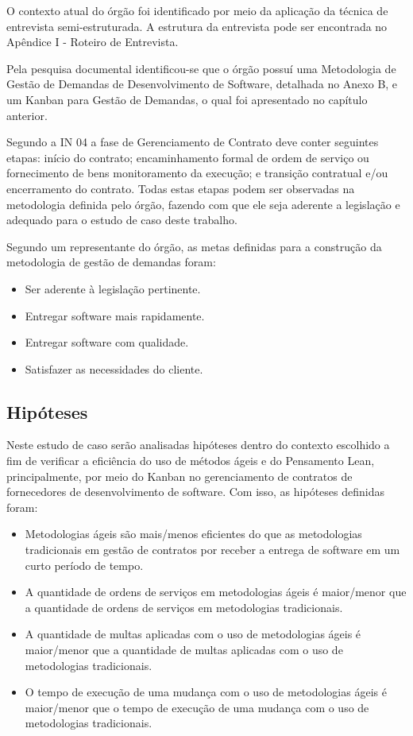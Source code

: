 O contexto atual do órgão foi identificado por meio da aplicação da técnica de entrevista semi-estruturada. A estrutura da entrevista pode ser encontrada no Apêndice I -  Roteiro de Entrevista. 

Pela pesquisa documental identificou-se que o órgão possuí uma Metodologia de Gestão de Demandas de Desenvolvimento de Software, detalhada no Anexo B, e um Kanban para Gestão de 
Demandas, o qual foi apresentado no capítulo anterior. 

Segundo a IN 04 a fase de Gerenciamento de Contrato deve conter seguintes etapas: início do contrato; encaminhamento formal de ordem de serviço ou fornecimento de bens  monitoramento da execução; e transição contratual e/ou encerramento do contrato. Todas estas etapas podem ser observadas na metodologia definida pelo órgão, fazendo com que ele seja aderente a legislação e adequado para o estudo de caso deste trabalho.

Segundo um representante do órgão, as metas definidas para a construção da metodologia de gestão de demandas foram:
\begin{itemize}
\item Ser aderente à legislação pertinente.
\item Entregar software mais rapidamente.
\item Entregar software com qualidade.
\item Satisfazer as necessidades do cliente.
\end{itemize}

\subsection[Hipóteses]{Hipóteses}

Neste estudo de caso serão analisadas hipóteses dentro do contexto escolhido a fim de verificar a eficiência do uso de métodos ágeis e do Pensamento Lean, principalmente, por meio do Kanban no gerenciamento de contratos de fornecedores de desenvolvimento de software. Com isso, as hipóteses definidas foram:
\begin{itemize}
\item  Metodologias ágeis são mais/menos eficientes do que as metodologias tradicionais em gestão de contratos por receber a entrega de software em um curto período de tempo.
\item	A quantidade de ordens de serviços em metodologias ágeis é maior/menor que a quantidade de ordens de serviços em metodologias tradicionais.
\item	A quantidade de multas aplicadas com o uso de metodologias ágeis é maior/menor que a quantidade de multas aplicadas com o uso de metodologias tradicionais.
\item	O tempo de execução de uma mudança com o uso de metodologias ágeis é maior/menor que o tempo de execução de uma mudança com o uso de metodologias tradicionais.
\end{itemize}


